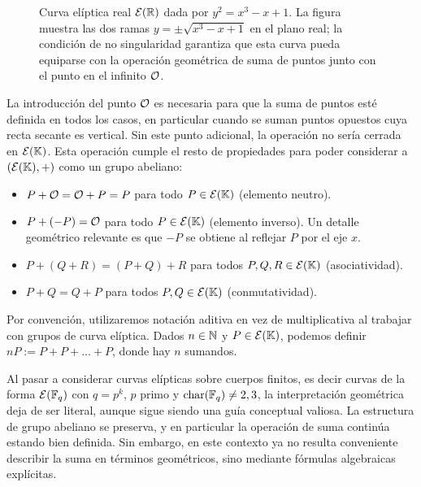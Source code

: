 \begin{figure}[!t]
	\centering
	\caption{Curva elíptica real $\mathcal{E}(\mathbb{R})$ dada por $y^2=x^3-x+1$. La figura muestra las dos ramas $y=\pm\sqrt{x^3-x+1}$ en el plano real; la condición de no singularidad garantiza que esta curva pueda equiparse con la operación geométrica de suma de puntos junto con el punto en el infinito $\mathcal{O}$.}
	\label{fig:curva-eliptica-real}
\end{figure}


La introducción del punto $\mathcal{O}$ es necesaria para que la suma de puntos esté definida en todos los casos, en particular cuando se suman puntos opuestos cuya recta secante es vertical. Sin este punto adicional, la operación no sería cerrada en $\mathcal{E}(\mathbb{K})$. Esta operación cumple el resto de propiedades para poder considerar a $(\mathcal{E}(\mathbb{K}), +)$ como un grupo abeliano:
\begin{itemize}
	\item $P + \mathcal{O} = \mathcal{O} + P = P$ para todo $P \in \mathcal{E}(\mathbb{K})$ (elemento neutro).
	\item $P + (-P) = \mathcal{O}$ para todo $P \in \mathcal{E}(\mathbb{K})$ (elemento inverso). Un detalle geométrico relevante es que $-P$ se obtiene al reflejar $P$ por el eje $x$.
	\item $P + (Q + R) = (P + Q) + R$ para todos $P, Q, R \in \mathcal{E}(\mathbb{K})$ (asociatividad).
	\item $P + Q = Q + P$ para todos $P, Q \in \mathcal{E}(\mathbb{K})$ (conmutatividad).
\end{itemize}

Por convención, utilizaremos notación aditiva en vez de multiplicativa al trabajar con grupos de curva elíptica. Dados $n \in \mathbb{N}$ y $P \in \mathcal{E}(\mathbb{K})$, podemos definir $nP := P + P + \ldots + P$, donde hay $n$ sumandos.

Al pasar a considerar curvas elípticas sobre cuerpos finitos, es decir curvas de la forma $\mathcal{E}(\mathbb{F}_q)$ con $q = p^k$, $p$ primo y $\mathrm{char}(\mathbb{F}_q) \neq 2,3$, la interpretación geométrica deja de ser literal, aunque sigue siendo una guía conceptual valiosa. La estructura de grupo abeliano se preserva, y en particular la operación de suma continúa estando bien definida. Sin embargo, en este contexto ya no resulta conveniente describir la suma en términos geométricos, sino mediante fórmulas algebraicas explícitas.

